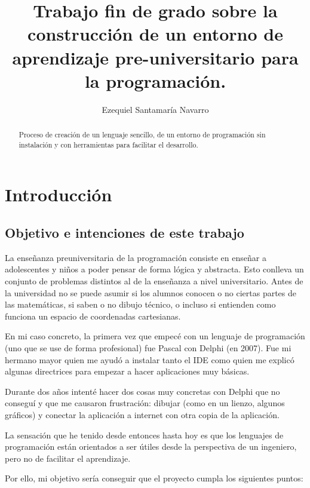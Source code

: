 \documentclass{report}
\author{Ezequiel Santamaría Navarro}
\title{Trabajo fin de grado sobre la construcción de un entorno de aprendizaje pre-universitario para la programación.}
\begin{document}
	\maketitle
	\tableofcontents
	
	\begin{abstract}
		Proceso de creación de un lenguaje sencillo, de un entorno de programación sin instalación y con herramientas para facilitar el desarrollo.
	\end{abstract}
	
	
	\chapter{Introducción}
	
	
	\section{Objetivo e intenciones de este trabajo}
	
	
	La enseñanza preuniversitaria de la programación consiste en enseñar a adolescentes y niños a poder pensar de forma lógica y abstracta. Esto conlleva un conjunto de problemas distintos al de la enseñanza a nivel universitario. Antes de la universidad no se puede asumir si los alumnos conocen o no ciertas partes de las matemáticas, si saben o no dibujo técnico, o incluso si entienden como funciona un espacio de coordenadas cartesianas.
	
	En mi caso concreto, la primera vez que empecé con un lenguaje de programación (uno que se use de forma profesional) fue Pascal con Delphi (en 2007). Fue mi hermano mayor quien me ayudó a instalar tanto el IDE como quien me explicó algunas directrices para empezar a hacer aplicaciones muy básicas.
	
	Durante dos años intenté hacer dos cosas muy concretas con Delphi que no conseguí y que me causaron frustración: dibujar (como en un lienzo, algunos gráficos) y conectar la aplicación a internet con otra copia de la aplicación.
	
	La sensación que he tenido desde entonces hasta hoy es que los lenguajes de programación están orientados a ser útiles desde la perspectiva de un ingeniero, pero no de facilitar el aprendizaje. 
	
	Por ello, mi objetivo sería conseguir que el proyecto cumpla los siguientes puntos:
	
\end{document}
